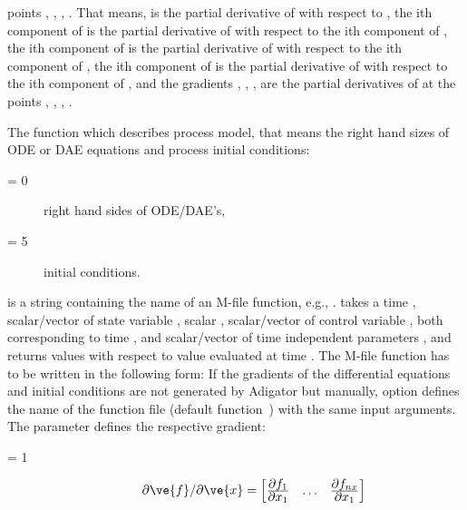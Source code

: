 \begin{description}
  points , , , . That means,
   is the partial derivative of  with respect
  to , the ith component of  is the partial
  derivative of  with respect to the ith component of
  , the ith component of  is the partial
  derivative of  with respect to the ith component of
  , the ith component of  is the partial
  derivative of  with respect to the ith component of
  , and the gradients , ,
  ,  are the partial derivatives of
   at the points , , ,
  . 
\item[\argfun{process}] The function which describes process model,
  that means the right hand sizes of ODE or DAE equations and process
  initial conditions:
  \begin{description}
  \item[ = 0] right hand sides of ODE/DAE's,
  \item[ = 5] initial conditions.
  \end{description}
   is a string containing the name of an M-file
  function, e.g., .  takes a time
  , scalar/vector of state variable , scalar
  , scalar/vector of control variable , both
  corresponding to time , and scalar/vector of time
  independent parameters , and returns  values
  with respect to  value evaluated at time .
  The M-file function has to be written in the following form: 
  {\small }
  If the gradients of the differential equations and initial conditions
  are not generated by Adigator
  but manually, option  defines the name of the
  function file (default function~) with the same input
  arguments. The parameter  defines the respective gradient:
  \begin{description}
  \item[ = 1] 
    \begin{equation*}
      \partial \ve{f}/\partial \ve{x} = 
      \begin{bmatrix}
      \frac{\displaystyle \partial{f_{1}}}{\displaystyle \partial{x_{1}}}
      & \ldots &
      \frac{\displaystyle \partial{f_{nx}}}{\displaystyle \partial{x_{1}}}\\

\end{bmatrix}
\end{equation*}
\end{description}
\end{description}
